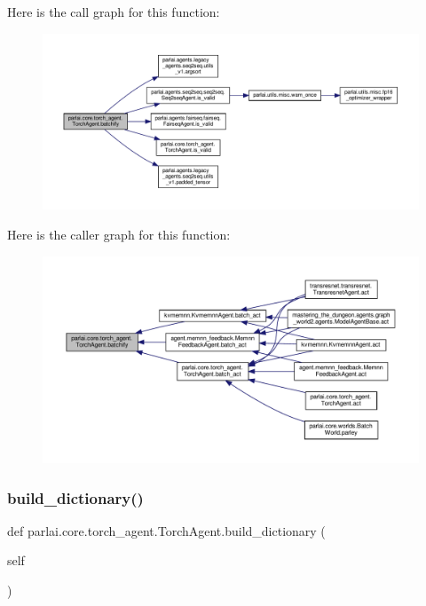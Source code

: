 Here is the call graph for this function\+:
\nopagebreak
\begin{figure}[H]
\begin{center}
\leavevmode
\includegraphics[width=350pt]{classparlai_1_1core_1_1torch__agent_1_1TorchAgent_a4c5824776df0c6cf995984a5e7a3f433_cgraph}
\end{center}
\end{figure}
Here is the caller graph for this function\+:
\nopagebreak
\begin{figure}[H]
\begin{center}
\leavevmode
\includegraphics[width=350pt]{classparlai_1_1core_1_1torch__agent_1_1TorchAgent_a4c5824776df0c6cf995984a5e7a3f433_icgraph}
\end{center}
\end{figure}
\mbox{\label{classparlai_1_1core_1_1torch__agent_1_1TorchAgent_a233316f9ec2805dd6a08fbf07f3a078a}} 
\subsubsection{\texorpdfstring{build\+\_\+dictionary()}{build\_dictionary()}}
{\footnotesize\ttfamily def parlai.\+core.\+torch\+\_\+agent.\+Torch\+Agent.\+build\+\_\+dictionary (\begin{DoxyParamCaption}\item[{}]{self }\end{DoxyParamCaption})}

